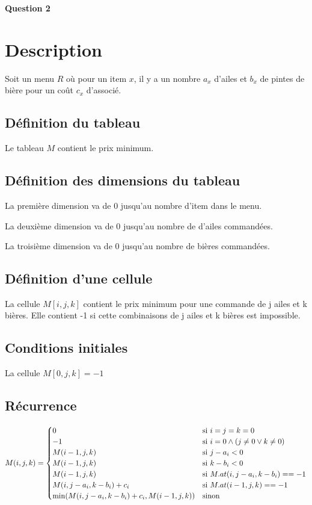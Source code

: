 \documentclass[class=article]{standalone}
\begin{document}
\centerline{\Huge \bf Question 2}
\bigskip

\section*{Description}

Soit un menu $R$ où pour un item $x$, il y a un nombre $a_x$ d'ailes 
et $b_x$ de pintes de bière pour un coût $c_x$ d'associé.

\subsection*{Définition du tableau}

Le tableau $M$ contient le prix minimum.

\subsection*{Définition des dimensions du tableau}

La première dimension va de 0 jusqu'au nombre d'item dans le menu.

La deuxième dimension va de 0 jusqu'au nombre de d'ailes commandées.

La troisième dimension va de 0 jusqu'au nombre de bières commandées.

\subsection*{Définition d'une cellule}

La cellule $M[i,j,k]$ contient le prix minimum pour une commande de j ailes et k bières.
Elle contient -1 si cette combinaisons de j ailes et k bières est impossible.


\subsection*{Conditions initiales}

La cellule $M[0, j, k] = -1$

\subsection*{Récurrence}

\[
    M(i, j, k) =
    \begin{cases}
        0 & \text{si } i = j = k = 0 \\
        -1 & \text{si } i = 0 \wedge \left ( j \neq 0 \vee k \neq 0 \right ) \\
        M(i-1, j, k) & \text{si } j-a_i < 0 \\
        M(i-1, j, k) & \text{si } k-b_i < 0 \\
        M(i-1, j, k) & \text{si } M.at(i, j-a_i, k-b_i) == -1 \\
        M(i, j-a_i, k-b_i) + c_i & \text{si } M.at(i-1, j, k) == -1 \\
        \min(M(i, j-a_i, k-b_i) + c_i, M(i-1, j, k))  & \text{sinon } \\
    \end{cases}
\]
\end{document}

